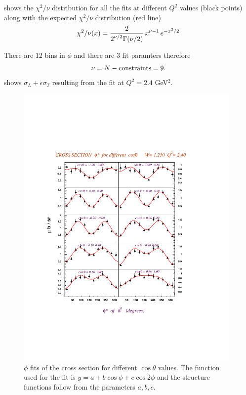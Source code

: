  shows the  $\chi^2/\nu$ distribution for all the fits at different $Q^2$ 
values (black points) along with the expected $\chi^2/\nu$ distribution (red line)
\begin{equation}
\chi^2/\nu(x) = \frac{\displaystyle 2}{\displaystyle 2^{\nu /2} \Gamma(\nu /2)} \, x^{\nu-1}\, e^{-x^2/2}
\end{equation}



There are 12 bins in $\phi$ and there  are 3 fit paramters therefore
$$
 \nu = {N-{\rm constraints}} = 9.
$$
 shows $\sigma_L + \epsilon\sigma_T$ resulting from the fit at $Q^2 = 2.4$ GeV$^2$.

\begin{figure}[h]
 \includegraphics[width = 11cm, bb=60 120 420 640]{analysis/img/bac_phi_W1.23_Q22.40}
  \caption[$\phi$ fits of the cross section for different $\cos\theta$ values]
          { $\phi$ fits of the cross section for different $\cos\theta$ values.
	             The function used for the fit is $ y = a + b\cos\phi + c\cos 2\phi$
		     and the structure functions follow from the parameters $a,b,c$.}
 \label{fig:bac_phi_W1.23_Q22.40}

\end{figure}
\cia

